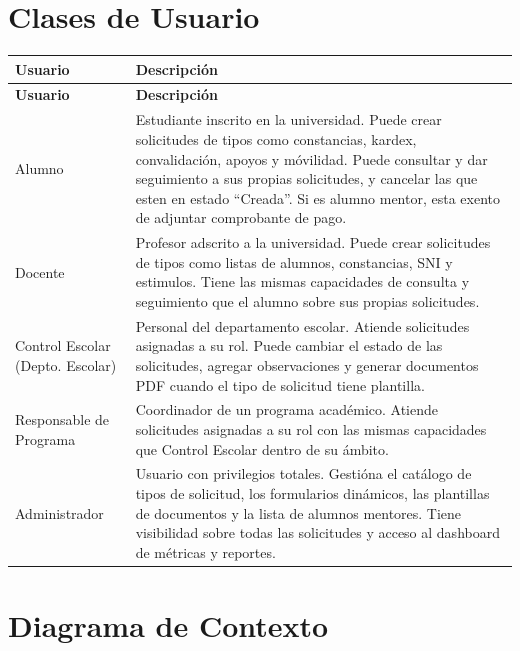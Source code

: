 \section{Clases de Usuario}

\begin{longtable}{|L{3.2cm}|L{10.5cm}|}
    \hline
    \textbf{Usuario} & \textbf{Descripción} \\
    \hline
    \endfirsthead
    \hline
    \textbf{Usuario} & \textbf{Descripción} \\
    \hline
    \endhead
    \hline
    \endfoot

    Alumno & Estudiante inscrito en la universidad. Puede crear solicitudes de tipos como constancias, kardex, convalidación, apoyos y móvilidad. Puede consultar y dar seguimiento a sus propias solicitudes, y cancelar las que esten en estado ``Creada''. Si es alumno mentor, esta exento de adjuntar comprobante de pago. \\
    \hline
    Docente & Profesor adscrito a la universidad. Puede crear solicitudes de tipos como listas de alumnos, constancias, SNI y estimulos. Tiene las mismas capacidades de consulta y seguimiento que el alumno sobre sus propias solicitudes. \\
    \hline
    Control Escolar (Depto. Escolar) & Personal del departamento escolar. Atiende solicitudes asignadas a su rol. Puede cambiar el estado de las solicitudes, agregar observaciones y generar documentos PDF cuando el tipo de solicitud tiene plantilla. \\
    \hline
    Responsable de Programa & Coordinador de un programa académico. Atiende solicitudes asignadas a su rol con las mismas capacidades que Control Escolar dentro de su ámbito. \\
    \hline
    Administrador & Usuario con privilegios totales. Gestióna el catálogo de tipos de solicitud, los formularios dinámicos, las plantillas de documentos y la lista de alumnos mentores. Tiene visibilidad sobre todas las solicitudes y acceso al dashboard de métricas y reportes. \\
    \hline
\end{longtable}

\section{Diagrama de Contexto}

